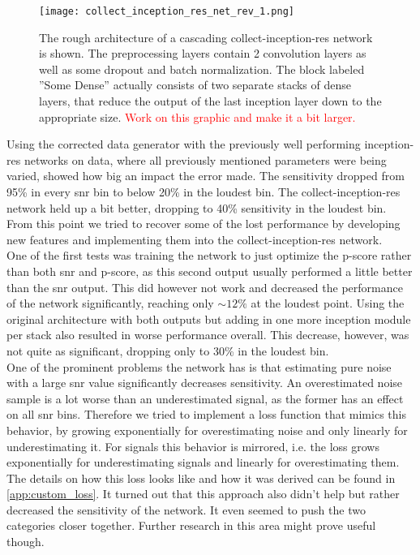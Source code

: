 \begin{figure}
\centering
\texttt{[image: collect\_inception\_res\_net\_rev\_1.png]}
\caption[Cascading architecture of a collect-inception-res network]{The rough architecture of a cascading collect-inception-res network is shown. The preprocessing layers contain 2 convolution layers as well as some dropout and batch normalization. The block labeled ''Some Dense'' actually consists of two separate stacks of dense layers, that reduce the output of the last inception layer down to the appropriate size. \textcolor{red}{Work on this graphic and make it a bit larger.}}\label{fig:cascade_inception_res_net}
\end{figure}

\noindent Using the corrected data generator with the previously well performing inception-res networks on data, where all previously mentioned parameters were being varied, showed how big an impact the error made. The sensitivity dropped from 95\% in every \gls{snr} bin to below 20\% in the loudest bin. The collect-inception-res network held up a bit better, dropping to 40\% sensitivity in the loudest bin. From this point we tried to recover some of the lost performance by developing new features and implementing them into the collect-inception-res network.\medskip\\
One of the first tests was training the network to just optimize the p-score rather than both \gls{snr} and p-score, as this second output usually performed a little better than the \gls{snr} output. This did however not work and decreased the performance of the network significantly, reaching only $\sim 12\%$ at the loudest point. Using the original architecture with both outputs but adding in one more inception module per stack also resulted in worse performance overall. This decrease, however, was not quite as significant, dropping only to 30\% in the loudest bin.\smallskip\\
One of the prominent problems the network has is that estimating pure noise with a large \gls{snr} value significantly decreases sensitivity. An overestimated noise sample is a lot worse than an underestimated signal, as the former has an effect on all \gls{snr} bins. Therefore we tried to implement a loss function that mimics this behavior, by growing exponentially for overestimating noise and only linearly for underestimating it. For signals this behavior is mirrored, i.e. the loss grows exponentially for underestimating signals and linearly for overestimating them. The details on how this loss looks like and how it was derived can be found in \autoref{app:custom_loss}. It turned out that this approach also didn't help but rather decreased the sensitivity of the network. It even seemed to push the two categories closer together. Further research in this area might prove useful though.\medskip\\
